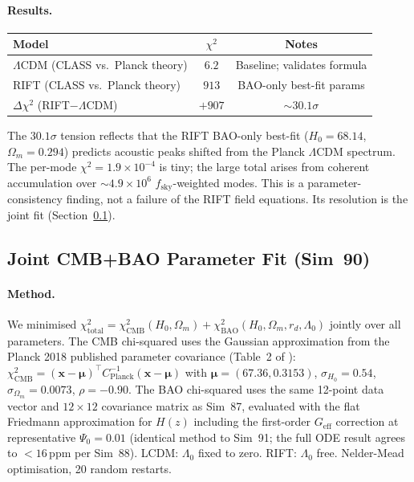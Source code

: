 \documentclass[12pt,a4paper]{article}
\begin{document}
\paragraph{Results.}
\begin{center}
\begin{tabular}{lcc}
\toprule
Model & $\chi^2$ & Notes \\
\midrule
$\Lambda$CDM (CLASS vs.\ Planck theory) & $6.2$ & Baseline; validates formula \\
RIFT (CLASS vs.\ Planck theory) & $913$ & BAO-only best-fit params \\
$\Delta\chi^2$ (RIFT$-\Lambda$CDM) & $+907$ & $\sim 30.1\sigma$ \\
\bottomrule
\end{tabular}
\end{center}
The $30.1\sigma$ tension reflects that the RIFT BAO-only best-fit
($H_0 = 68.14$, $\Omega_m = 0.294$) predicts acoustic peaks shifted
from the Planck $\Lambda$CDM spectrum. The per-mode $\chi^2 = 1.9 \times 10^{-4}$
is tiny; the large total arises from coherent accumulation over $\sim 4.9 \times 10^6$
$f_{\mathrm{sky}}$-weighted modes. This is a parameter-consistency finding, not a
failure of the RIFT field equations. Its resolution is the joint fit (Section~\ref{sec:obs_joint}).

\subsection{Joint CMB+BAO Parameter Fit (Sim~90)}
\label{sec:obs_joint}

\paragraph{Method.} We minimised
$\chi^2_{\mathrm{total}} = \chi^2_{\mathrm{CMB}}(H_0, \Omega_m) + \chi^2_{\mathrm{BAO}}(H_0, \Omega_m, r_d, \Lambda_0)$
jointly over all parameters. The CMB chi-squared uses the Gaussian
approximation from the Planck 2018 published parameter covariance
(Table~2 of \citealt{Planck2020}):
$\chi^2_{\mathrm{CMB}} = (\mathbf{x}-\boldsymbol{\mu})^\top C_{\mathrm{Planck}}^{-1}(\mathbf{x}-\boldsymbol{\mu})$
with $\boldsymbol{\mu} = (67.36, 0.3153)$,
$\sigma_{H_0} = 0.54$, $\sigma_{\Omega_m} = 0.0073$, $\rho = -0.90$.
The BAO chi-squared uses the same 12-point data vector and $12\times12$
covariance matrix as Sim~87, evaluated with the flat Friedmann
approximation for $H(z)$ including the first-order $G_\mathrm{eff}$
correction at representative $\Psi_0 = 0.01$
(identical method to Sim~91; the full ODE result agrees to $<16$\,ppm
per Sim~88).
LCDM: $\Lambda_0$ fixed to zero. RIFT: $\Lambda_0$ free.
Nelder-Mead optimisation, 20 random restarts.
\end{document}
